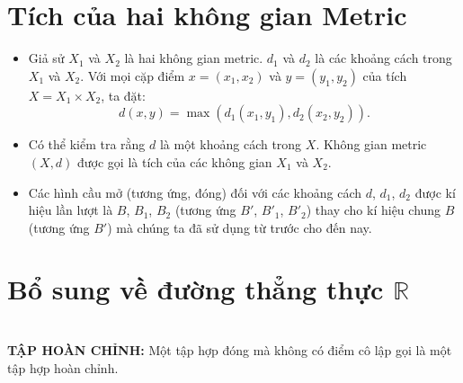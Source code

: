 \documentclass[12pt,a4paper]{article}
\begin{document}
\section{Tích của hai không gian Metric}
\begin{itemize}
\item Giả sử $X_1$ và $X_2$ là hai không gian metric. $d_1$ và $d_2$ là các khoảng cách trong $X_1$ và $X_2$. Với mọi cặp điểm $x = (x_1, x_2)$ và $y = (y_1, y_2)$ của tích $ X = X_1 \times X_2$, ta đặt:\\
\begin{equation*}
d(x,y) = \max(d_1(x_1, y_1), d_2(x_2, y_2)).
\end{equation*}
\item Có thể kiểm tra rằng $d$ là một khoảng cách trong $X$. Không gian metric $(X,d)$ được gọi là {\color{red}tích} của các không gian $X_1$ và $X_2$.\\
\item Các hình cầu mở (tương ứng, đóng) đối với các khoảng cách $d$, $d_1$, $d_2$ được kí hiệu lần lượt là $B$, $B_1$, $B_2$ (tương ứng $B'$, $B'_1$, $B'_2$) thay cho kí hiệu chung $B$ (tương ứng $B'$) mà chúng ta đã sử dụng từ trước cho đến nay.
\end{itemize}
 
\section{Bổ sung về đường thẳng thực $\mathds{R}$}\\

\hspace{0.7cm}\textbf{TẬP HOÀN CHỈNH:} Một tập hợp đóng mà không có điểm cô lập gọi là một {\color{red}tập hợp hoàn chỉnh}.\\
\end{document}
